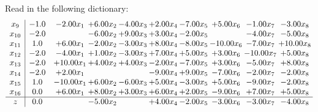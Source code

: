 \documentclass[9pt]{article}
\begin{document}
Read in the following dictionary:
\[\begin{array}{c| c c@{\hskip 2pt} c@{\hskip 2pt} c@{\hskip 2pt} c@{\hskip 2pt} c@{\hskip 2pt} c@{\hskip 2pt} c@{\hskip 2pt} c@{\hskip 2pt} }
 x_{9}   &  -1.0 & -2.00 x_{1} & +  6.00 x_{2} & -4.00 x_{3} & +  2.00 x_{4} & -7.00 x_{5} & +  5.00 x_{6} & -1.00 x_{7} & -3.00 x_{8}\\
 x_{10}   &  -2.0  &   & -6.00 x_{2} & +  9.00 x_{3} & +  3.00 x_{4} & -2.00 x_{5} &   & -4.00 x_{7} & -5.00 x_{8}\\
 x_{11}   &  1.0 & +  6.00 x_{1} & -2.00 x_{2} & -3.00 x_{3} & +  8.00 x_{4} & -8.00 x_{5} & -10.00 x_{6} & -7.00 x_{7} & + 10.00 x_{8}\\
 x_{12}   &  -2.0 & -4.00 x_{1} & +  1.00 x_{2} & -3.00 x_{3} & +  7.00 x_{4} & +  5.00 x_{5} & +  3.00 x_{6} & -10.00 x_{7} & +  5.00 x_{8}\\
 x_{13}   &  -2.0 & + 10.00 x_{1} & +  4.00 x_{2} & +  4.00 x_{3} & -2.00 x_{4} & -7.00 x_{5} & +  3.00 x_{6} & -5.00 x_{7} & +  8.00 x_{8}\\
 x_{14}   &  -2.0 & +  2.00 x_{1} &    &   & -9.00 x_{4} & +  9.00 x_{5} & -7.00 x_{6} & -2.00 x_{7} & -2.00 x_{8}\\
 x_{15}   &  1.0 & -10.00 x_{1} & +  6.00 x_{2} & -6.00 x_{3} & +  5.00 x_{4} & -3.00 x_{5} & +  5.00 x_{6} & -9.00 x_{7} & -2.00 x_{8}\\
 x_{16}   &  0.0 & +  6.00 x_{1} & +  8.00 x_{2} & +  3.00 x_{3} & +  6.00 x_{4} & +  2.00 x_{5} & -9.00 x_{6} & +  7.00 x_{7} & +  5.00 x_{8}\\
\hline
z    &  0.0  &   & -5.00 x_{2} &   & +  4.00 x_{4} & -2.00 x_{5} & -3.00 x_{6} & -3.00 x_{7} & -4.00 x_{8}\\
\end{array}\]
\end{document}
